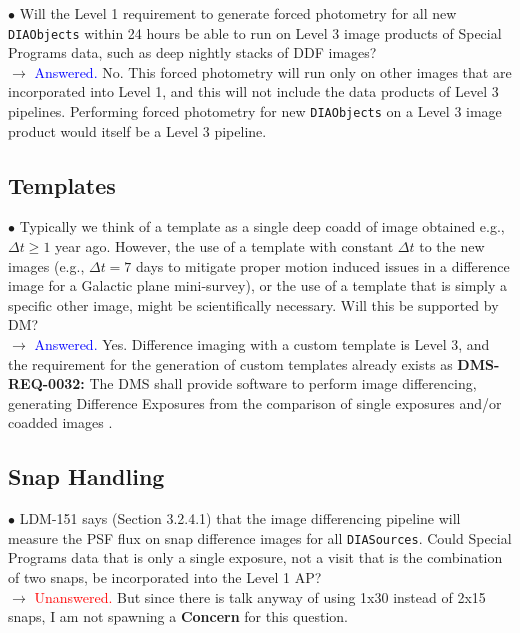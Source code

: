 \documentclass[DM,lsstdraft,toc]{lsstdoc}
\begin{document}
$\bullet$ Will the Level 1 requirement to generate forced photometry for all new {\tt DIAObjects} within 24 hours be able to run on Level 3 image products of Special Programs data, such as deep nightly stacks of DDF images? \\
$\rightarrow$ \textcolor{blue}{Answered.} No. This forced photometry will run only on other images that are incorporated into Level 1, and this will not include the data products of Level 3 pipelines. Performing forced photometry for new {\tt DIAObjects} on a Level 3 image product would itself be a Level 3 pipeline.


\subsection{Templates}\label{ssec:issues_templates}

$\bullet$ Typically we think of a template as a single deep coadd of image obtained e.g., $\Delta t \geq 1$ year ago. However, the use of a template with constant $\Delta t$ to the new images (e.g., $\Delta t = 7$ days to mitigate proper motion induced issues in a difference image for a Galactic plane mini-survey), or the use of a template that is simply a specific other image, might be scientifically necessary. Will this be supported by DM? \\
$\rightarrow$ \textcolor{blue}{Answered.} Yes. Difference imaging with a custom template is Level 3, and the requirement for the generation of custom templates already exists as \textbf{DMS-REQ-0032:} The DMS shall provide software to perform image differencing, generating Difference Exposures from the comparison of single exposures and/or coadded images \citep{LSE-61}.


\subsection{Snap Handling}\label{ssec:issues_snaps}

$\bullet$ LDM-151 says (Section 3.2.4.1) that the image differencing pipeline will measure the PSF flux on snap difference images for all {\tt DIASources}. Could Special Programs data that is only a single exposure, not a visit that is the combination of two snaps, be incorporated into the Level 1 AP? \\
$\rightarrow$ \textcolor{red}{Unanswered.} But since there is talk anyway of using 1x30 instead of 2x15 snaps, I am not spawning a \textbf{Concern} for this question.
\end{document}
